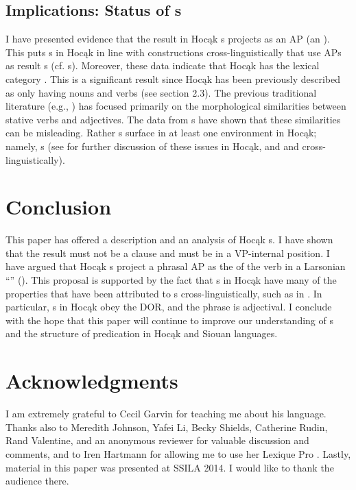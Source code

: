 \documentclass[output=paper]{LSP/langsci}
\begin{document}
\subsection{Implications: Status of s}

 
I have presented evidence that the result  in Hocąk s projects as an AP (an ). This puts s in Hocąk in line with  constructions cross-linguistically that use APs as result s (cf.  s). Moreover, these data indicate that Hocąk has the lexical category . This is a significant result since Hocąk has been previously described as only having nouns and verbs (see section 2.3). The previous traditional literature (e.g., \citealt{Helmbrecht2006b}) has focused primarily on the morphological similarities between stative verbs and adjectives. The data from s have shown that these similarities can be misleading. Rather s surface in at least one environment in Hocąk; namely, s (see \citealt{Rosen2014,Rosen2015} for further discussion of these issues in Hocąk, and \citealt{Baker2003} and \citealt{Dixon2004} cross-linguistically).

\section{Conclusion}\label{sec:rosen:6}
This paper has offered a description and an analysis of Hocąk s. I have shown that the result  must not be a clause and must be in a VP-internal position. I have argued that Hocąk s project a phrasal AP as the  of the verb in a Larsonian ``'' (\citealt{Larson1988}). This proposal is supported by the fact that s in Hocąk have many of the properties that have been attributed to s cross-linguistically, such as in . In particular, s in Hocąk obey the DOR, and the  phrase is adjectival. I conclude with the hope that this paper will continue to improve our understanding of s and the structure of predication in Hocąk and Siouan languages.
 

\section* {Acknowledgments}
I am extremely grateful to Cecil Garvin for teaching me about his language. Thanks also to Meredith Johnson, Yafei Li, Becky Shields, Catherine Rudin, Rand Valentine, and an anonymous reviewer for valuable discussion and comments, and to Iren Hartmann for allowing me to use her Lexique Pro . Lastly, material in this paper was presented at SSILA 2014. I would like to thank the audience there.
\end{document}
